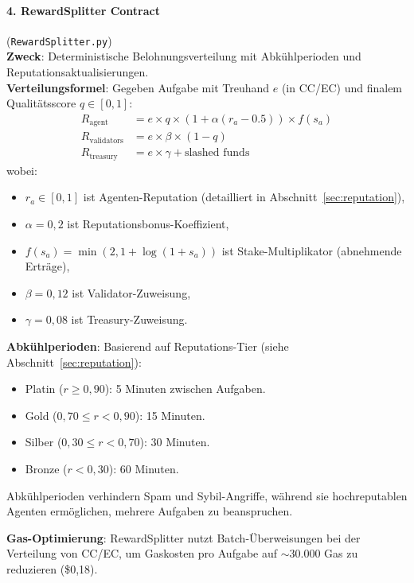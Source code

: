 \documentclass[11pt]{article}
\begin{document}
\paragraph{4. RewardSplitter Contract} (\texttt{RewardSplitter.py})\\
\textbf{Zweck}: Deterministische Belohnungsverteilung mit Abkühlperioden und Reputationsaktualisierungen.\\
\textbf{Verteilungsformel}: Gegeben Aufgabe mit Treuhand $e$ (in CC/EC) und finalem Qualitätsscore $q \in [0,1]$:
\begin{align}
R_{\text{agent}} &= e \times q \times \left(1 + \alpha (r_a - 0.5)\right) \times f(s_a) \label{eq:reward-agent} \\
R_{\text{validators}} &= e \times \beta \times (1-q) \label{eq:reward-validators} \\
R_{\text{treasury}} &= e \times \gamma + \text{slashed funds} \label{eq:reward-treasury}
\end{align}
wobei:
\begin{itemize}[noitemsep]
  \item $r_a \in [0,1]$ ist Agenten-Reputation (detailliert in Abschnitt~\ref{sec:reputation}),
  \item $\alpha = 0,2$ ist Reputationsbonus-Koeffizient,
  \item $f(s_a) = \min(2, 1 + \log(1+s_a))$ ist Stake-Multiplikator (abnehmende Erträge),
  \item $\beta = 0,12$ ist Validator-Zuweisung,
  \item $\gamma = 0,08$ ist Treasury-Zuweisung.
\end{itemize}
\textbf{Abkühlperioden}: Basierend auf Reputations-Tier (siehe Abschnitt~\ref{sec:reputation}):
\begin{itemize}[noitemsep]
  \item Platin ($r \geq 0,90$): 5 Minuten zwischen Aufgaben.
  \item Gold ($0,70 \leq r < 0,90$): 15 Minuten.
  \item Silber ($0,30 \leq r < 0,70$): 30 Minuten.
  \item Bronze ($r < 0,30$): 60 Minuten.
\end{itemize}
Abkühlperioden verhindern Spam und Sybil-Angriffe, während sie hochreputablen Agenten ermöglichen, mehrere Aufgaben zu beanspruchen.

\textbf{Gas-Optimierung}: RewardSplitter nutzt Batch-Überweisungen bei der Verteilung von CC/EC, um Gaskosten pro Aufgabe auf $\sim$30.000 Gas zu reduzieren (\$0,18).
\end{document}
